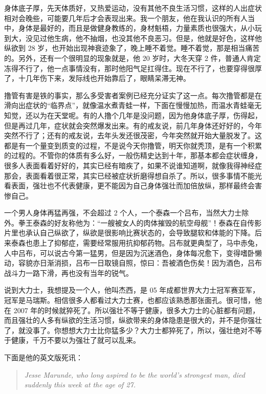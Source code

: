 身体底子厚，先天体质好，又热爱运动，没有其他不良生活习惯，这样的人出症状相对会晚些，可能要几年后才会表现出来。我一个朋友，他在我认识的所有人当中，身体是最好的，而且是做健身教练的，身材魁梧，力量素质也很强大，从小玩到大，没见过他生病，他不抽烟，也没其他不良恶习。但是，他就是好色，这样他纵欲到 28 岁，也开始出现神衰迹象了，晚上睡不着觉。睡不着觉，那是相当痛苦的。另外，还有一个很明显的现象就是，他 20 岁时，大冬天穿 2 件，普通人肯定冻得不行了，他一点事情没有，那时他阳气足扛得住。现在不行了，也要穿得很厚了，十几年伤下来，发际线也开始靠后了，眼睛呆滞无神。

撸管有害是铁的事实，那么多受害者案例已经充分证实了这一点。每次撸管都是在滑向出症状的“临界点”，就像温水煮青蛙一样，下面在慢慢加热，而温水青蛙毫无知觉，还以为在天堂呢。有的人撸个几年是没问题，因为他身体底子厚，伤得起，但是再过几年，症状就会突然爆发出来。有的戒友说，前几年身体还好好的，今年突然不行了；还有的戒友说，去年头发还很茂密，今年突然就开始大量脱发了。这都是有一个量变到质变的过程，不是说今天你撸管，明天你就秃顶，是有一个积累的过程的。不管你的体质有多么好，一般伤精史达到十年，那基本都会症状缠身，很多人表面看着好好的，其实已经有暗疾了，如果不说谁知道啊，就像我得神经症那会，表面看着很正常，其实已经被症状折磨得想自杀了。所以，很多事情不能光看表面，强壮也不代表健康，更不能因为自己身体强壮而加倍放纵，那样最终会害惨自己。

一个男人身体再猛再强，不会超过 2 个人，一个泰森一个吕布，当然大力士除外。拳王泰森的好友称他为：“一艘被女人的肉体摧毁的航空母舰”！泰森在自传影片里也承认自己纵欲了，纵欲是很影响比赛状态的，会导致腿软和体能的下降。后来泰森也患上了抑郁症，需要经常服用抗抑郁药物。吕布就更典型了，马中赤兔，人中吕布，可以说古今第一猛男，但是因为沉迷酒色，身体每况愈下，变得嗜卧懒动，容貌亦日渐消损，吕布一日取镜自照，惊曰：吾被酒色伤矣！因为酒色，吕布战斗力一路下滑，再也没有当年的锐气。

说到大力士，我想提及一个人，他叫杰西，是 05 年成都世界大力士冠军赛亚军，冠军是马瑞斯。相信很多人都看过大力士赛，也都应该熟悉那张面孔。很可惜，他在 2007 年的时候就猝死了。所以强壮不等于健康，很多大力士的心脏都有问题，而且强壮的人多有纵欲的生活习惯，纵欲带来的身体隐患是很大的，并不是你强壮了，就没事了。你想想大力士比你猛多少？大力士都猝死了，所以，强壮绝对不等于健康，千万不要以为强壮了就可以乱来。

下面是他的英文版死讯：

\begin{quote}\it
    Jesse Marunde, who long aspired to be the world's strongest man, died suddenly this week at the age of 27.
\end{quote}

